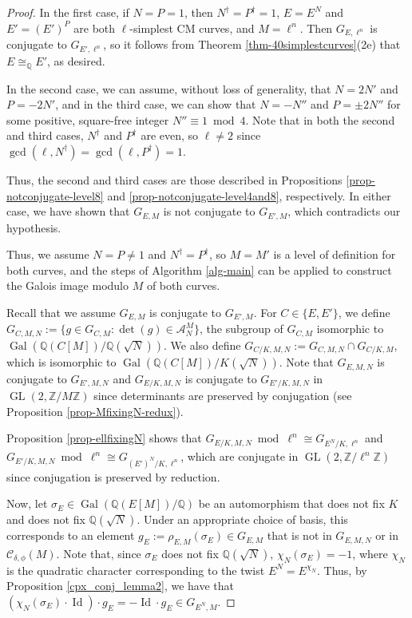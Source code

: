 \documentclass[11pt]{amsart}
\theoremstyle{definition}
\newcommand{\Q}{\mathbb{Q}}
\newcommand{\Z}{\mathbb{Z}}
\newcommand{\Gal}{\operatorname{Gal}}
\newcommand{\GL}{\operatorname{GL}}
\DeclareMathOperator{\Id}{Id}  %
\begin{document}
\begin{proof}
    In the first case, if $N = P = 1$, then $N^{\dagger} = P^{\dagger} = 1$, $E = E^N$ and $E' = (E')^P$ are both $\ell$-simplest CM curves, and $M = \ell^n$. Then $G_{E, \ell^n}$ is conjugate to $G_{E', \ell^n}$, so it follows from Theorem \ref{thm-40simplestcurves}(2e) that $E \cong_{\Q} E'$, as desired.
    
    In the second case, we can assume, without loss of generality, that $N = 2N'$ and $P = -2N'$, and in the third case, we can show that $N = -N''$ and $P = \pm 2 N''$ for some positive, square-free integer $N'' \equiv 1 \bmod 4$. Note that in both the second and third cases, $N^{\dagger}$ and $P^{\dagger}$ are even, so $\ell \neq 2$ since $\gcd(\ell, N^{\dagger}) = \gcd(\ell, P^{\dagger}) = 1$.

    Thus, the second and third cases are those described in Propositions \ref{prop-notconjugate-level8} and \ref{prop-notconjugate-level4and8}, respectively. In either case, we have shown that $G_{E, M}$ is not conjugate to $G_{E', M}$, which contradicts our hypothesis.

    Thus, we assume $N = P \neq 1$ and $N^{\dagger} = P^{\dagger}$, so $M = M'$ is a level of definition for both curves, and the steps of Algorithm \ref{alg-main} can be applied to construct the Galois image modulo $M$ of both curves.

    Recall that we assume $G_{E, M}$ is conjugate to $G_{E', M}$. For $C \in \{E, E'\}$, we define $G_{C, M, N} := \{ g \in G_{C, M} : \det(g) \in \mathcal{A}_{N}^{M} \}$, the subgroup of $G_{C, M}$ isomorphic to $\Gal(\Q(C[M])/\Q(\sqrt{N}))$. We also define $G_{C/K, M, N} := G_{C, M, N} \cap G_{C/K, M}$, which is isomorphic to $\Gal(\Q(C[M])/K(\sqrt{N}))$. Note that $G_{E, M, N}$ is conjugate to $G_{E', M, N}$ and $G_{E/K, M, N}$ is conjugate to $G_{E'/K, M, N}$ in $\GL(2, \Z/M\Z)$ since determinants are preserved by conjugation (see Proposition \ref{prop-MfixingN-redux}).
    
    Proposition \ref{prop-ellfixingN} shows that $G_{E/K, M, N} \bmod{\ell^n} \cong G_{E^N/K, \ell^n}$ and $G_{E'/K, M, N} \bmod{\ell^n} \cong G_{(E')^N/K, \ell^n}$, which are conjugate in $\GL(2,\Z/\ell^n\Z)$ since conjugation is preserved by reduction.


    Now, let $\sigma_E \in \Gal(\Q(E[M])/\Q)$ be an automorphism that does not fix $K$ and does not fix $\Q(\sqrt{N})$. Under an appropriate choice of basis, this corresponds to an element $g_E := \rho_{E,M}(\sigma_E) \in G_{E, M}$ that is not in $G_{E, M, N}$ or in $\mathcal{C}_{\delta, \phi}(M)$. Note that, since $\sigma_E$ does not fix $\Q(\sqrt{N})$, $\chi_N(\sigma_E) = -1$, where $\chi_N$ is the quadratic character  corresponding to the twist $E^N = E^{\chi_N}$. Thus, by Proposition \ref{cpx_conj_lemma2}, we have that $(\chi_{N}(\sigma_E) \cdot \Id) \cdot g_E = -\Id \cdot g_E \in G_{E^N, M}$. 
    

\end{proof}
\end{document}
